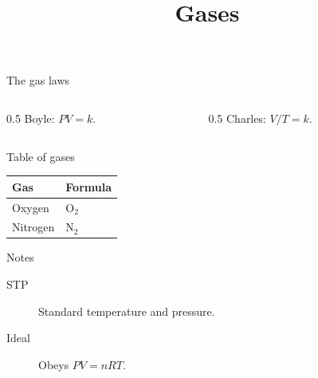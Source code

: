 \documentclass{beamer}
\title{Gases}
\begin{document}
\begin{frame}{The gas laws}
  \begin{columns}
    \begin{column}{0.5\textwidth}
      Boyle: $PV = k$.
    \end{column}
    \begin{column}{0.5\textwidth}
      Charles: $V/T = k$.
    \end{column}
  \end{columns}
\end{frame}
\begin{frame}{Table of gases}
  \begin{tabular}{@{}ll@{}}
    \toprule
    Gas & Formula \\
    \midrule
    Oxygen & O$_2$ \\
    Nitrogen & N$_2$ \\
    \bottomrule
  \end{tabular}
\end{frame}
\begin{frame}{Notes}
  \begin{description}
    \item[STP] Standard temperature and pressure.
    \item[Ideal] Obeys $PV = nRT$.
  \end{description}
\end{frame}
\end{document}
